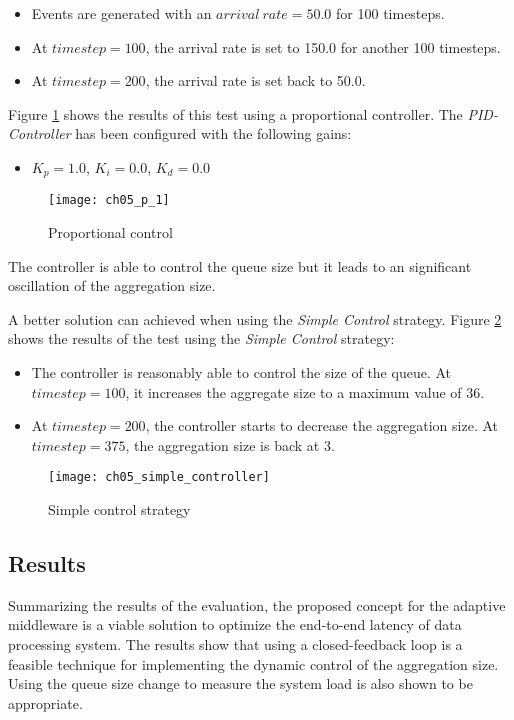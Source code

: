 \begin{itemize}
	\item Events are generated with an $arrival\ rate = 50.0$ for 100 timesteps. 
	\item At $timestep = 100$, the arrival rate is set to 150.0 for another 100 timesteps. 
	\item At $timestep = 200$, the arrival rate is set back to 50.0.
\end{itemize}

Figure \ref{fig:ch5_proportional_control} shows the results of this test using a proportional controller. The \emph{PID-Controller} has been configured with the following gains:
\begin{itemize}
	\item $K_p=1.0$, $K_i=0.0$, $K_d=0.0$
\end{itemize}

\begin{figure}[htpb]
	\centering
	\texttt{[image: ch05\_p\_1]}
	\caption{Proportional control}
	\label{fig:ch5_proportional_control}
\end{figure}

The controller is able to control the queue size but it leads to an significant oscillation of the aggregation size. 

A better solution can achieved when using the \emph{Simple Control} strategy. Figure \ref{fig:ch5_dynamic_test_simple_controller} shows the results of the test using the \emph{Simple Control} strategy:

\begin{itemize}
	\item The controller is reasonably able to control the size of the queue. At $timestep = 100$, it increases the aggregate size to a maximum value of 36. 
	\item At $timestep = 200$, the controller starts to decrease the aggregation size. At $timestep = 375$, the aggregation size is back at 3.
\end{itemize}

\begin{figure}[htpb]
	\centering
	\texttt{[image: ch05\_simple\_controller]}
	\caption{Simple control strategy}
	\label{fig:ch5_dynamic_test_simple_controller}
\end{figure}

\subsection{Results}
Summarizing the results of the evaluation, the proposed concept for the adaptive middleware is a viable solution to optimize the end-to-end latency of data processing system. The results show that using a closed-feedback loop is a feasible technique for implementing the dynamic control of the aggregation size. Using the queue size change to measure the system load is also shown to be appropriate.

